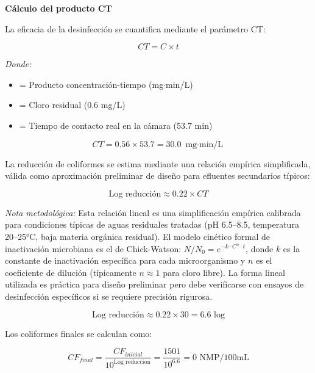 \documentclass[12pt,a4paper]{article}
\begin{document}
\textbf{Cálculo del producto CT}

La eficacia de la desinfección se cuantifica mediante el parámetro CT:

\begin{equation}
CT = C \times t
\end{equation}

\textit{Donde:}
\begin{itemize}[noitemsep,leftmargin=2em]
    \item[$CT$] = Producto concentración-tiempo (mg$\cdot$min/L)
    \item[$C$] = Cloro residual (0.6 mg/L)
    \item[$t$] = Tiempo de contacto real en la cámara (53.7 min)
\end{itemize}

\begin{equation}
CT = 0.56 \times 53.7 = 30.0 \text{ mg$\cdot$min/L}
\end{equation}

La reducción de coliformes se estima mediante una relación empírica simplificada, válida como aproximación preliminar de diseño para efluentes secundarios típicos:

\begin{equation}
\text{Log reducción} \approx 0.22 \times CT
\end{equation}

\textit{Nota metodológica:} Esta relación lineal es una simplificación empírica calibrada para condiciones típicas de aguas residuales tratadas (pH 6.5--8.5, temperatura 20--25°C, baja materia orgánica residual). El modelo cinético formal de inactivación microbiana es el de Chick-Watson: $N/N_0 = e^{-k \cdot C^n \cdot t}$, donde $k$ es la constante de inactivación específica para cada microorganismo y $n$ es el coeficiente de dilución (típicamente $n \approx 1$ para cloro libre). La forma lineal utilizada es práctica para diseño preliminar pero debe verificarse con ensayos de desinfección específicos si se requiere precisión rigurosa.

\begin{equation}
\text{Log reducción} \approx 0.22 \times 30 = 6.6 \text{ log}
\end{equation}

Los coliformes finales se calculan como:

\begin{equation}
CF_{final} = \frac{CF_{inicial}}{10^{\text{Log reduccion}}} = \frac{1501}{10^{6.6}} = 0 \text{ NMP/100mL}
\end{equation}
\end{document}
